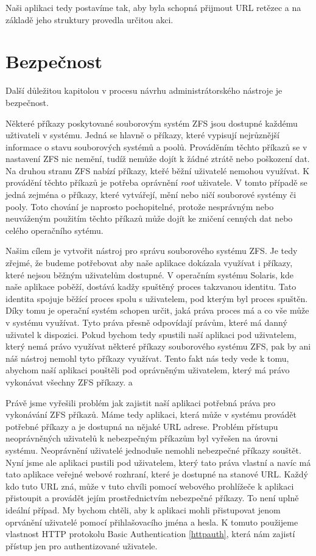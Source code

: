 Naši aplikaci tedy postavíme tak, aby byla schopná přijmout URL retězec a na základě jeho struktury provedla určitou akci. 
\section{Bezpečnost}
Další důležitou kapitolou v procesu návrhu administrátorského nástroje je bezpečnost.

Některé příkazy poskytované souborovým systém ZFS jsou dostupné každému užtivateli v systému. Jedná se hlavně o příkazy, které vypisují nejrůznější informace o stavu souborových systémů a poolů. Prováděním těchto příkazů se v nastavení ZFS nic nemění, tudíž nemůže dojít k žádné ztrátě nebo poškození dat. Na druhou stranu ZFS nabízí příkazy, kteřé běžní uživatelé nemohou využívat. K provádění těchto příkazů je potřeba oprávnění \emph{root} uživatele. V tomto případě se jedná zejména o příkazy, které vytvářejí, mění nebo ničí souborové systémy či pooly. Toto chování je naprosto pochopitelné, protože nesprávným nebo neuváženým použitím těchto příkazů může dojít ke zničení cenných dat nebo celého operačního sytému.

Našim cílem je vytvořit nástroj pro správu souborového systému ZFS. Je tedy zřejmé, že budeme potřebovat aby naše aplikace dokázala využívat i příkazy, které nejsou běžným uživatelům dostupné. V operačním systému Solaris, kde naše aplikace poběží, dostává kadžy spuštěný proces takzvanou identitu. Tato identita spojuje běžící proces spolu s uživatelem, pod kterým byl proces spuštěn. Díky tomu je operační systém schopen určit, jaká práva proces má a co vše může v systému využívat. Tyto práva přesně odpovídají právům, které má danný uživatel k dispozici. Pokud bychom tedy spustili naší aplikaci pod uživatelem, který nemá právo využívat některé příkazy souborového systému ZFS, pak by ani náš nástroj nemohl tyto příkazy využívat. Tento fakt nás tedy vede k tomu, abychom naší aplikaci pouštěli pod oprávněným uživatelem, který má právo vykonávat všechny ZFS příkazy. a

Právě jsme vyřešili problém jak zajistit naší aplikaci potřebná práva pro vykonávání ZFS příkazů. Máme tedy aplikaci, která může v systému provádět potřebné příkazy a je dostupná na nějaké URL adrese. Problém přístupu neoprávněných uživatelů k nebezpečným příkazům byl vyřešen na úrovni systému. Neoprávnění uživatelé jednoduše nemohli nebezpečné příkazy souštět. Nyní jsme ale aplikaci pustili pod uživatelem, který tato práva vlastní a navíc má tato aplikace veřejné webové rozhraní, které je dostupné na stanové URL. Každý kdo tuto URL zná, může v tuto chvíli pomocí webového prohlížeče k aplikaci přistoupit a provádět jejím prostřednictvím nebezpečné příkazy. To není uplně ideální případ. My bychom chtěli, aby k aplikaci mohli přistupovat jenom oprvánění uživatelé pomocí přihlašovacího jména a hesla. K tomuto použijeme vlastnost HTTP protokolu Basic Authentication \ref{httpauth}, která nám zajistí přístup jen pro authentizované uživatele.

